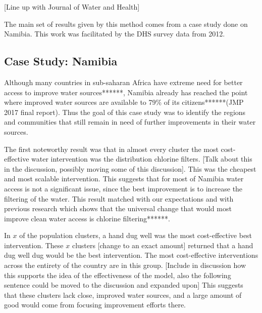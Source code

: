 [Line up with Journal of Water and Health]

The main set of results given by this method comes from a case study done on Namibia. This work was facilitated by the DHS survey data from 2012.

\subsection{Case Study: Namibia}

Although many countries in sub-saharan Africa have extreme need for better access to improve water sources******,  Namibia already has reached the point where improved water sources are available to 79\% of its citizens******(JMP 2017 final report).
Thus the goal of this case study was to identify the regions and communities that still remain in need of further improvements in their water sources.  

The first noteworthy result was that in almost every cluster the most cost-effective water intervention was the distribution chlorine filters. [Talk about this in the discussion, possibly moving some of this discussion].
This was the cheapest and most scalable intervention.
This suggests that for most of Namibia water access is not a significant issue, since the best improvement is to increase the filtering of the water.
This result matched with our expectations and with previous research which shows that the universal change that would most improve clean water access is chlorine filtering******.

In $x$ of the population clusters, a hand dug well was the most cost-effective best intervention.
These $x$ clusters [change to an exact amount] returned that a hand dug well dug would be the best intervention.
The most cost-effective interventions across the entirety of the country are in this group. 
[Include in discussion how this supports the idea of the effectiveness of the model, also the following sentence could be moved to the discussion and expanded upon]
This suggests that these clusters lack close, improved water sources, and a large amount of good would come from focusing improvement efforts there.


